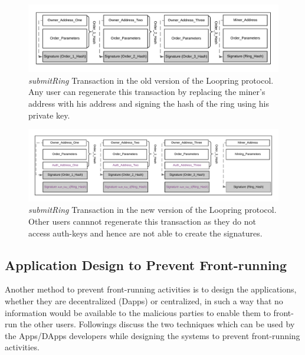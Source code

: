 \begin{figure}[h]
\centering
\includegraphics[width=0.7\linewidth]{figures/Vulnerable_Loopring.png}
\caption{\emph{submitRing} Transaction in the old version of the Loopring protocol. Any user can regenerate this transaction by replacing the miner's address with his address and signing the hash of the ring using his private key. \label{fig:vulnerable_loopring}}
\end{figure}
\begin{figure}[h]
\centering
\includegraphics[width=0.7\linewidth]{figures/Dual_Authoring_Loopring.png}
\caption{\emph{submitRing} Transaction in the new version of the Loopring protocol. Other users cannnot regenerate this transaction as they do not access auth-keys and hence are not able to create the signatures. \label{fig:not_vulnerable_loopring}}
\end{figure}
\subsection{Application Design to Prevent Front-running}

Another method to prevent front-running activities is to design the applications, whether they are decentralized (Dapps) or centralized, in such a way that no information would be available to the malicious parties to enable them to front-run the other users.
Followings discuss the two techniques which can be used by the Apps/DApps developers while designing the systems to prevent front-running activities.



